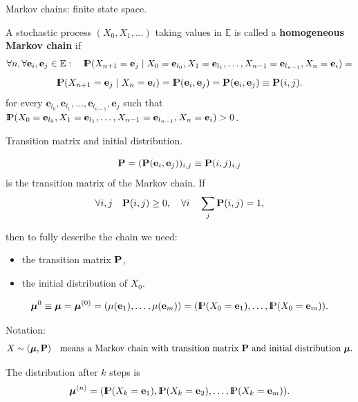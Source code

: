 \documentclass[aspectratio=169]{beamer}
\newcommand{\Prob}{{\rm I\hspace{-0.8mm}P}}
\newcommand{\e}[0]{\textbf{e}}
\newcommand{\E}[0]{\mathbb{E}}
\begin{document}
\begin{frame}{Markov chains: finite state space.}

A stochastic process \( (X_0, X_1, \ldots) \) taking values in \( \E \)
is called a \textbf{homogeneous Markov chain} if
$$
\forall n, \forall \e_i, \e_j \in \E:
\quad
\Prob(X_{n+1} = \e_j \mid X_0 = \e_{l_0}, X_1=\e_{l_1},\ldots, X_{n-1}=\e_{l_{n-1}}, X_n = \e_i)=
$$
$$\Prob(X_{n+1} = \e_j \mid X_n = \e_i)
= \Prob(\e_i, \e_j) =\bfP(\e_i,\e_j)\equiv \bfP(i,j).
$$
for every $\e_{l_0}, \e_{l_1},\ldots, \e_{l_{n-1}}, \e_j$ such that
$\Prob( X_0 = \e_{l_0}, X_1=\e_{l_1},\ldots, X_{n-1}=\e_{l_{n-1}}, X_n = \e_i)>0$.



\end{frame}


\begin{frame}{Transition matrix and initial distribution.}

\[
\bfP = (\bfP(\e_i,\e_j))_{i,j}\equiv \bfP(i,j)_{i,j}
\]
is the transition matrix of the Markov chain.
If
\[
\forall i,j \quad \mathbf{P}(i,j) \ge 0,
\quad
\forall i \quad \sum_j \mathbf{P}(i,j) = 1,
\]

then to fully describe the chain we need:
\begin{itemize}
\item the transition matrix \(\mathbf{P}\),
\item the initial distribution of \(X_0\).
\end{itemize}

\[
\bfmu^0 \equiv \bfmu = \bfmu^{(0)} =
(\mu(\e_1), \ldots, \mu(\e_m))
= (\Prob(X_0 = \e_1), \ldots, \Prob(X_0 = \e_m)).
\]

Notation:
\[
X \sim (\mbox{\boldmath $\mu$}, \mathbf{P})
\quad \text{means a Markov chain with transition matrix } \mathbf{P}
\text{ and initial distribution } \mbox{\boldmath $\mu$}.
\]

The distribution after \(k\) steps is
\[
\bfmu^{(n)} =
(\Prob(X_k = \e_1), \Prob(X_k = \e_2), \ldots, \Prob(X_k= \e_m)).
\]

\end{frame}
\end{document}
